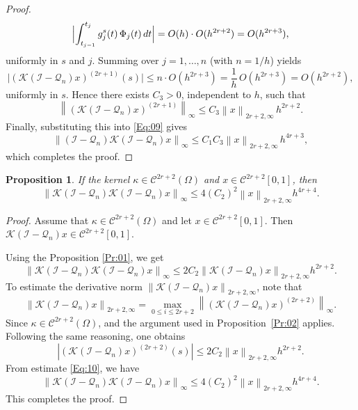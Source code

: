 \documentclass[]{interact}
\theoremstyle{plain}%
\newtheorem{proposition}[theorem]{Proposition}
\theoremstyle{definition}
\theoremstyle{remark}
\newcommand{\norm}[1]{\left\lVert #1\right\rVert}
\begin{document}
\begin{proof}
\[	\Bigl|\int_{t_{j-1}}^{t_j} g_j^s(t)\,\Phi_j(t)\,dt\Bigr| = O(h)\cdot O(h^{2r+2})
	= O(h^{2r+3}),
	\]
	uniformly in $s$ and $j$. Summing over $j=1,\dots,n$ (with $n=1/h$) yields
	\[
	\bigl|(\mathcal{K}(\mathcal{I}-\mathcal{Q}_n)x)^{(2r+1)}(s)\bigr|
	\le n\cdot O(h^{2r+3}) = \frac{1}{h}\,O(h^{2r+3}) = O(h^{2r+2}),
	\]
	uniformly in $s$. Hence there exists $C_3 >0$, independent to $h$, such that
	\[
	\norm{(\mathcal{K}(\mathcal{I}-\mathcal{Q}_n)x)^{(2r+1)}}_\infty
	\le C_3 \norm{x}_{2r+2,\infty}\,h^{2r+2}.
	\]
	Finally, substituting this into \eqref{Eq:09} gives
	\[
	\norm{(\mathcal{I}-\mathcal{Q}_n)\mathcal{K}(\mathcal{I}-\mathcal{Q}_n)x}_\infty
	\le C_1C_3 \norm{x}_{2r+2,\infty}\,h^{4r+3},
	\]
	which completes the proof.
\end{proof}

\begin{proposition} \label{Pr:03}
	If the kernel $\kappa \in \mathcal{C}^{2r+2}(\Omega)$ and 
	$x \in \mathcal{C}^{2r+2}[0,1]$, then
	\[
	\norm{\mathcal{K}(\mathcal{I} - \mathcal{Q}_n)\mathcal{K}(\mathcal{I} - \mathcal{Q}_n)x}_\infty 
	\le 4(C_2)^2  \norm{x}_{2r +2, \infty} h^{4r+4}.
	\]
\end{proposition}
\vspace*{-0.2in}
\begin{proof}
	Assume that $\kappa \in \mathcal{C}^{2r+2}(\Omega)$ and let
	$x \in \mathcal{C}^{2r+2}[0,1]$. Then
	$
	\mathcal{K}(\mathcal{I}-\mathcal{Q}_n)x \in \mathcal{C}^{2r+2}[0,1].
	$
	
	\noindent
	Using the Proposition \ref{Pr:01}, we get
	\begin{equation}\label{Eq:10}	
		\norm{\mathcal{K}(\mathcal{I} - \mathcal{Q}_n)\mathcal{K}(\mathcal{I} - \mathcal{Q}_n)x}_\infty \le 2C_2 \norm{\mathcal{K}(\mathcal{I} - \mathcal{Q}_n)x}_{2r+2,\infty} h^{2r+2}.  
	\end{equation}
	To estimate the derivative norm $\norm{\mathcal{K}(\mathcal{I}-\mathcal{Q}_n)x}_{2r+2,\infty}$, 
	note that
	\begin{equation*} 
		\norm{\mathcal{K}(\mathcal{I} - \mathcal{Q}_n)x}_{2r+2,\infty} = \max_{0 \leq i \leq 2r + 2} \norm{\left(\mathcal{K}(\mathcal{I} - \mathcal{Q}_n)x\right)^{(2r+2)}}_\infty.
	\end{equation*}
	Since $\kappa \in \mathcal{C}^{2r+2}(\Omega)$, and the argument used in Proposition~\ref{Pr:02} applies. 
	Following the same reasoning, one obtains
	\begin{equation*}
		\left|\left(\mathcal{K}(\mathcal{I} - \mathcal{Q}_n)x\right)^{(2r+2)}(s)\right| \le  2 C_2 \norm{x}_{2r +2, \infty} h^{2r + 2}.
	\end{equation*}
	From estimate \eqref{Eq:10}, we have
	\begin{equation*}	
		\norm{\mathcal{K}(\mathcal{I} - \mathcal{Q}_n)\mathcal{K}(\mathcal{I} - \mathcal{Q}_n)x}_\infty \le 4(C_2)^2  \norm{x}_{2r +2, \infty} h^{4r+4}.
	\end{equation*}
	This completes the proof.
\end{proof}
\end{document}
